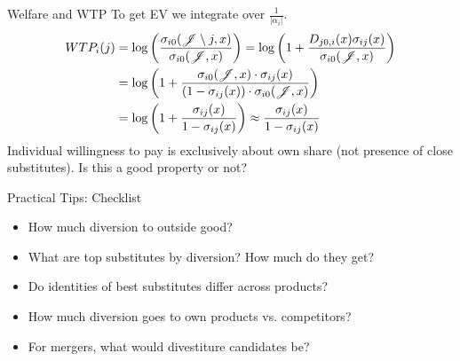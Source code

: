 \documentclass[aspectratio=169,10pt]{beamer}
\begin{document}
\begin{frame}{Welfare and WTP}
To get EV we integrate over $\frac{1}{|\alpha_i|}$.
\begin{align*}
WTP_i(j) &=\log \left( \frac{\sigma_{i0}(\mathscr{J}\setminus j,x) }{\sigma_{i0}(\mathscr{J},x) }\right)
=\log \left( 1+\frac{D_{j0,i}(x) \sigma_{ij}(x)}{\sigma_{i0}(\mathscr{J},x) }\right)\\
&=\log \left( 1+\frac{\sigma_{i0}(\mathscr{J},x) \cdot \sigma_{ij}(x)}{(1-\sigma_{ij}(x)) \cdot \sigma_{i0}(\mathscr{J},x) }\right)\\
&=\log \left( 1+\frac{\sigma_{ij}(x)}{1-\sigma_{ij}(x)  }\right)
\approx \frac{\sigma_{ij}(x)}{1-\sigma_{ij}(x) }
\end{align*}
Individual willingness to pay is exclusively about \alert{own share} (not presence of close substitutes). Is this a good property or not?
\end{frame}


\begin{frame}{Practical Tips: Checklist}
\begin{itemize}
\item How much diversion to outside good?
\item What are top substitutes by diversion? How much do they get?
\item Do identities of best substitutes differ across products?
\item How much diversion goes to own products vs. competitors?
\item For mergers, what would \alert{divestiture} candidates be?
\end{itemize}
\end{frame}
\end{document}

